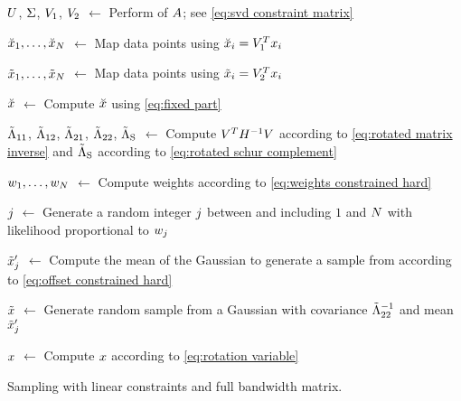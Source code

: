 \begin{algorithm}[t]
	
	$U$, $\Sigma$, $V_1$, $V_2$ $\gets$ Perform  of $A$; see \cref{eq:svd constraint matrix}
	
	$\breve{x}_{1},\ldots,\breve{x}_{N}$ $\gets$ Map data points using $\breve{x}_{i} = V_1^T x_{i}$
		
	$\tilde{x}_{1},\ldots,\tilde{x}_{N}$ $\gets$ Map data points using $\tilde{x}_{i} = V_2^T x_{i}$
	
	$\breve{x}$ $\gets$ Compute $\breve{x}$ using \cref{eq:fixed part}
	
	$\tilde{\Lambda}_{11}$, $\tilde{\Lambda}_{12}$, $\tilde{\Lambda}_{21}$, $\tilde{\Lambda}_{22}$, $\tilde{\Lambda}_{\mathrm{S}}$ $\gets$ Compute $V^T H^{-1} V$ according to \cref{eq:rotated matrix inverse} and $\tilde{\Lambda}_{\mathrm{S}}$ according to \cref{eq:rotated schur complement}
	
	$w_{1},\ldots,w_{N}$ $\gets$ Compute weights according to \cref{eq:weights constrained hard}
	
	$j$ $\gets$ Generate a random integer $j$ between and including $1$ and $N$ with likelihood proportional to $w_{j}$
	
	$\tilde{x}_{j}'$ $\gets$ Compute the mean of the Gaussian to generate a sample from according to \cref{eq:offset constrained hard}
	
	$\tilde{x}$ $\gets$ Generate random sample from a Gaussian with covariance $\tilde{\Lambda}_{22}^{-1}$ and mean $\tilde{x}_{j}'$
	
	$x$ $\gets$ Compute $x$ according to \cref{eq:rotation variable}
		
	\caption{Sampling with linear constraints and full bandwidth matrix.}
	\label{alg:constrained hard}
\end{algorithm}
